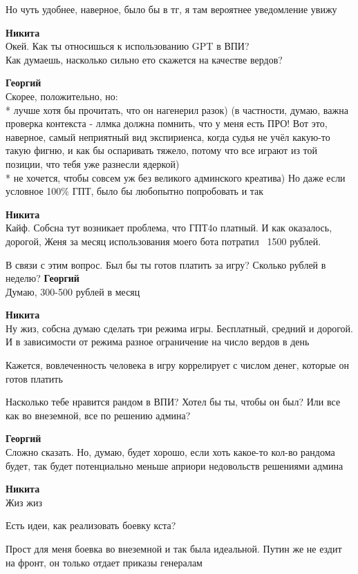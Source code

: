 \begin{tabbing}
Но чуть удобнее, наверное, было бы в тг, я там вероятнее уведомление увижу

\textbf{Никита} \\
Окей. Как ты относишься к использованию GPT в ВПИ? \\
Как думаешь, насколько сильно ето скажется на качестве вердов?

\textbf{Георгий} \\
Скорее, положительно, но: \\
* лучше хотя бы прочитать, что он нагенерил разок) (в частности, думаю, важна проверка контекста - ллмка должна помнить, что у меня есть ПРО! Вот это, наверное, самый неприятный вид экспириенса, когда судья не учёл какую-то такую фигню, и как бы оспаривать тяжело, потому что все играют из той позиции, что тебя уже разнесли ядеркой) \\
* не хочется, чтобы совсем уж без великого админского креатива) Но даже если условное 100\% ГПТ, было бы любопытно попробовать и так

\textbf{Никита} \\
Кайф. Собсна тут возникает проблема, что ГПТ4о платный. И как оказалось, дорогой, Женя за месяц использования моего бота потратил ~1500 рублей.

В связи с этим вопрос. Был бы ты готов платить за игру? Сколько рублей в неделю?
\textbf{Георгий} \\
Думаю, 300-500 рублей в месяц

\textbf{Никита} \\
Ну жиз, собсна думаю сделать три режима игры. Бесплатный, средний и дорогой. И в зависимости от режима разное ограничение на число вердов в день

Кажется, вовлеченность человека в игру коррелирует с числом денег, которые он готов платить

Насколько тебе нравится рандом в ВПИ? Хотел бы ты, чтобы он был? Или все как во внеземной, все по решению админа?

\textbf{Георгий} \\
Сложно сказать. Но, думаю, будет хорошо, если хоть какое-то кол-во рандома будет, так будет потенциально меньше априори недовольств решениями админа

\textbf{Никита} \\
Жиз жиз

Есть идеи, как реализовать боевку кста?

Прост для меня боевка во внеземной и так была идеальной. Путин же не ездит на фронт, он только отдает приказы генералам


\end{tabbing}
